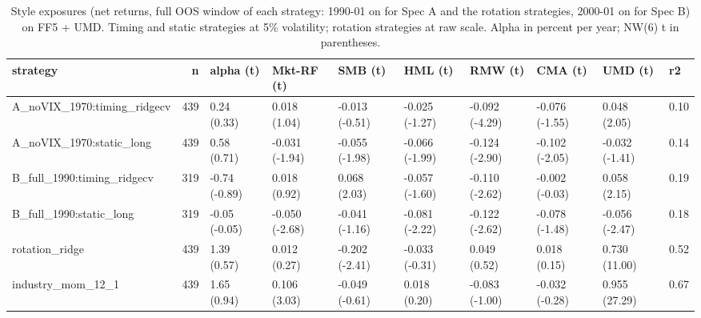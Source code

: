\begin{table}
\caption{Style exposures (net returns, full OOS window of each strategy: 1990-01 on for Spec A and the rotation strategies, 2000-01 on for Spec B) on FF5 + UMD. Timing and static strategies at 5\% volatility; rotation strategies at raw scale. Alpha in percent per year; NW(6) t in parentheses.}
\label{tab:m6_ff6_loadings}
\begin{tabular}{lrllllllll}
\toprule
strategy & n & alpha (t) & Mkt-RF (t) & SMB (t) & HML (t) & RMW (t) & CMA (t) & UMD (t) & r2 \\
\midrule
A\_noVIX\_1970:timing\_ridgecv & 439 & 0.24 (0.33) & 0.018 (1.04) & -0.013 (-0.51) & -0.025 (-1.27) & -0.092 (-4.29) & -0.076 (-1.55) & 0.048 (2.05) & 0.10 \\
A\_noVIX\_1970:static\_long & 439 & 0.58 (0.71) & -0.031 (-1.94) & -0.055 (-1.98) & -0.066 (-1.99) & -0.124 (-2.90) & -0.102 (-2.05) & -0.032 (-1.41) & 0.14 \\
B\_full\_1990:timing\_ridgecv & 319 & -0.74 (-0.89) & 0.018 (0.92) & 0.068 (2.03) & -0.057 (-1.60) & -0.110 (-2.62) & -0.002 (-0.03) & 0.058 (2.15) & 0.19 \\
B\_full\_1990:static\_long & 319 & -0.05 (-0.05) & -0.050 (-2.68) & -0.041 (-1.16) & -0.081 (-2.22) & -0.122 (-2.62) & -0.078 (-1.48) & -0.056 (-2.47) & 0.18 \\
rotation\_ridge & 439 & 1.39 (0.57) & 0.012 (0.27) & -0.202 (-2.41) & -0.033 (-0.31) & 0.049 (0.52) & 0.018 (0.15) & 0.730 (11.00) & 0.52 \\
industry\_mom\_12\_1 & 439 & 1.65 (0.94) & 0.106 (3.03) & -0.049 (-0.61) & 0.018 (0.20) & -0.083 (-1.00) & -0.032 (-0.28) & 0.955 (27.29) & 0.67 \\
\bottomrule
\end{tabular}
\end{table}

